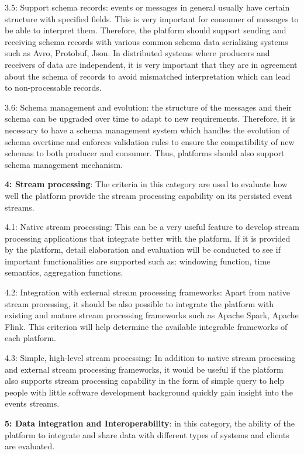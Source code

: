 3.5: Support schema records: events or messages in general usually have certain structure with specified fields. This is very important for consumer of messages to be able to interpret them. Therefore, the platform should support sending and receiving schema records with various common schema data serializing systems such as Avro, Protobuf, Json. 
In distributed systems where producers and receivers of data are independent, it is very important that they are in agreement about the schema of records to avoid mismatched interpretation which can lead to non-processable records. 

3.6: Schema management and evolution: the structure of the messages and their schema can be upgraded over time to adapt to new requirements. Therefore, it is necessary to have a schema management system which handles the evolution of schema overtime and enforces validation rules to ensure the compatibility of new schemas to both producer and consumer. Thus, platforms should also support schema management mechanism.

\textbf{4: Stream processing}: The criteria in this category are used to evaluate how well the platform provide the stream processing capability on its persisted event streams.

4.1: Native stream processing: This can be a very useful feature to develop stream processing applications that integrate better with the platform. If it is provided by the platform, detail elaboration and evaluation will be conducted to see if important functionalities are supported such as: windowing function, time semantics, aggregation functions.

4.2: Integration with external stream processing frameworks: Apart from native stream processing, it should be also possible to integrate the platform with existing and mature stream processing frameworks such as Apache Spark, Apache Flink. This criterion will help determine the available integrable frameworks of each platform.

4.3: Simple, high-level stream processing: In addition to native stream processing and external stream processing frameworks, it would be useful if the platform also supports stream processing capability in the form of simple query to help people with little software development background quickly gain insight into the events streams. 

\textbf{5: Data integration and Interoperability}: in this category, the ability of the platform to integrate and share data with different types of systems and clients are evaluated.

